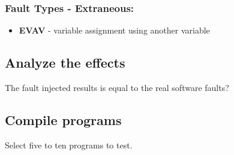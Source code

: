 \subsubsection{Fault Types - Extraneous:}
\begin{itemize}
	\item \textbf{EVAV} - variable assignment using another variable
\end{itemize}


\subsection{Analyze the effects}

The fault injected results is equal to the real software faults?

\subsection{Compile programs}

Select five to ten programs to test.

